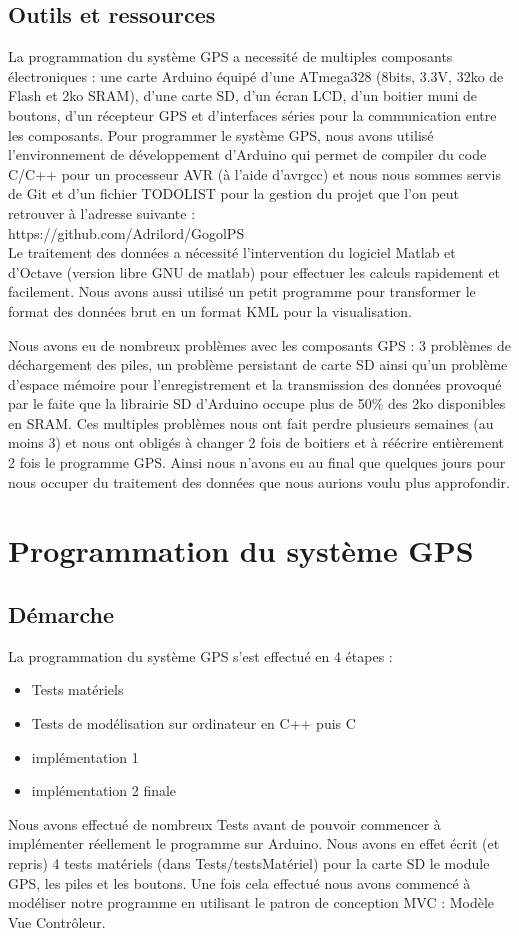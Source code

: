 \documentclass{report}
\begin{document}
\section{Outils et ressources}
La programmation du système GPS a necessité de multiples composants
électroniques : une carte Arduino équipé d'une ATmega328 (8bits, 3.3V,
32ko de Flash et 2ko SRAM), d'une carte SD, d'un écran LCD, d'un boitier
muni de boutons, d'un récepteur GPS et d'interfaces séries pour la 
communication entre les composants. Pour programmer le système GPS, nous
avons utilisé l'environnement de développement d'Arduino qui permet de
compiler du code C/C++ pour un processeur AVR (à l'aide d'avrgcc) et nous
nous sommes servis de Git et d'un fichier TODOLIST
 pour la gestion du projet que l'on peut retrouver
à l'adresse suivante : \\
https://github.com/Adrilord/GogolPS \\

Le traitement des données a nécessité l'intervention du logiciel Matlab
et d'Octave (version libre GNU de matlab)
pour effectuer les calculs rapidement et facilement. Nous avons aussi
utilisé un petit programme pour transformer le format des données brut
en un format KML pour la visualisation.

Nous avons eu de nombreux problèmes avec les composants GPS : 3 problèmes
de déchargement des piles, un problème persistant de carte SD ainsi qu'un
problème d'espace mémoire pour l'enregistrement et la transmission des
données provoqué par le faite que la librairie SD d'Arduino occupe plus
de 50\% des 2ko disponibles en SRAM. Ces multiples problèmes nous
ont fait perdre plusieurs semaines (au moins 3) et nous ont obligés à changer
2 fois de boitiers et à réécrire entièrement 2 fois le programme GPS. 
Ainsi nous n'avons eu au final que quelques jours pour nous occuper
du traitement des données que nous aurions voulu plus approfondir.

\chapter{Programmation du système GPS}
\section{Démarche}
La programmation du système GPS s'est effectué en 4 étapes :
\begin{itemize}
 \item Tests matériels
 \item Tests de modélisation sur ordinateur en C++ puis C
 \item implémentation 1 
 \item implémentation 2 finale
 \end{itemize}
Nous avons effectué de nombreux Tests avant de pouvoir commencer
à implémenter réellement le programme sur Arduino. Nous avons en effet
écrit (et repris) 4 tests matériels (dans Tests/testsMatériel) pour la carte SD
le module GPS, les piles et les boutons. 
Une fois cela effectué nous avons commencé à modéliser notre 
programme en utilisant le patron de conception MVC : Modèle Vue Contrôleur.
\end{document}

